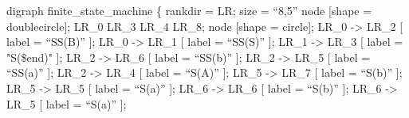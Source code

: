 \documentclass{article}
\begin{document}
\noindent{}digraph finite\_state\_machine \{
    rankdir = LR;
    size = \textquotedblleft{}8,5\textquotedblright{}
   \mdbr
{}    node [shape = doublecircle]; 
   \mdbr
{}    LR\_0 LR\_3 LR\_4 LR\_8;
   \mdbr
{}   node [shape = circle];
  \mdbr
{}   LR\_0 -\textgreater{} LR\_2 [ label = \textquotedblleft{}SS(B)\textquotedblright{} ];
   LR\_0 -\textgreater{} LR\_1 [ label = \textquotedblleft{}SS(S)\textquotedblright{} ];
   LR\_1 -\textgreater{} LR\_3 [ label = "S(\$end)" ];
   LR\_2 -\textgreater{} LR\_6 [ label = \textquotedblleft{}SS(b)\textquotedblright{} ];
   LR\_2 -\textgreater{} LR\_5 [ label = \textquotedblleft{}SS(a)\textquotedblright{} ];
   LR\_2 -\textgreater{} LR\_4 [ label = \textquotedblleft{}S(A)\textquotedblright{} ];
   LR\_5 -\textgreater{} LR\_7 [ label = \textquotedblleft{}S(b)\textquotedblright{} ];
   LR\_5 -\textgreater{} LR\_5 [ label = \textquotedblleft{}S(a)\textquotedblright{} ];
   LR\_6 -\textgreater{} LR\_6 [ label = \textquotedblleft{}S(b)\textquotedblright{} ];
   LR\_6 -\textgreater{} LR\_5 [ label = \textquotedblleft{}S(a)\textquotedblright{} ];
\end{document}
